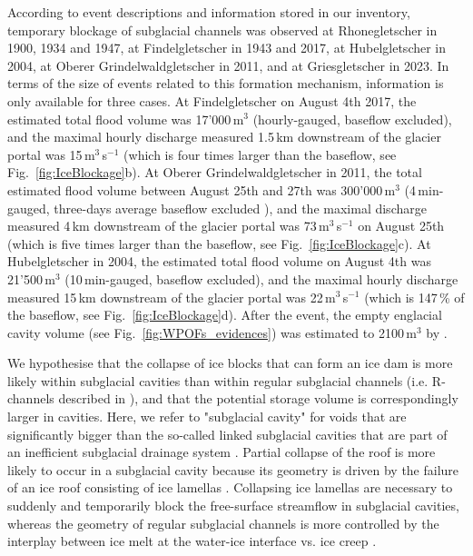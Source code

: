 According to event descriptions and information stored in our inventory, temporary blockage of subglacial channels was observed at Rhonegletscher in 1900, 1934 and 1947, at Findelgletscher in 1943 and 2017, at Hubelgletscher in 2004, at Oberer Grindelwaldgletscher in 2011, and at Griesgletscher in 2023. In terms of the size of events related to this formation mechanism, information is only available for three cases. At Findelgletscher on August 4th 2017, the estimated total flood volume was 17'000\,m$^3$ (hourly-gauged, baseflow excluded), and the maximal hourly discharge measured 1.5\,km downstream of the glacier portal was 15\,m$^3$\,s$^{-1}$ (which is four times larger than the baseflow, see Fig.~\ref{fig:IceBlockage}b). At Oberer Grindelwaldgletscher in 2011, the total estimated flood volume between August 25th and 27th was 300'000\,m$^3$ (4\,min-gauged, three-days average baseflow excluded \citep{Hahlen2011}), and the maximal discharge measured 4\,km downstream of the glacier portal was 73\,m$^3$\,s$^{-1}$ on August 25th (which is five times larger than the baseflow, see Fig.~\ref{fig:IceBlockage}c). At Hubelgletscher in 2004, the estimated total flood volume on August 4th was 21'500\,m$^3$ (10\,min-gauged, baseflow excluded), and the maximal hourly discharge measured 15\,km downstream of the glacier portal was 22\,m$^3$\,s$^{-1}$ (which is 147\,\% of the baseflow, see Fig.~\ref{fig:IceBlockage}d). After the event, the empty englacial cavity volume (see Fig.~\ref{fig:WPOFs_evidences}) was estimated to 2100\,m$^3$ by \cite{fink2004}. 

We hypothesise that the collapse of ice blocks that can form an ice dam is more likely within subglacial cavities than within regular subglacial channels (i.e. R-channels described in \cite{Roethlisberger1972}), and that the potential storage volume is correspondingly larger in cavities. Here, we refer to "subglacial cavity" for voids that are significantly bigger than the so-called linked subglacial cavities that are part of an inefficient subglacial drainage system \citep[e.g. Fig. 14 in][]{Fountain&Walder1998}. Partial collapse of the roof is more likely to occur in a subglacial cavity because its geometry is driven by the failure of an ice roof consisting of ice lamellas \citep{Ogier&al2022, Rass&al2023}. Collapsing ice lamellas are necessary to suddenly and temporarily block the free-surface streamflow in subglacial cavities, whereas the geometry of regular subglacial channels is more controlled by the interplay between ice melt at the water-ice interface vs. ice creep \citep{Roethlisberger1972}.

